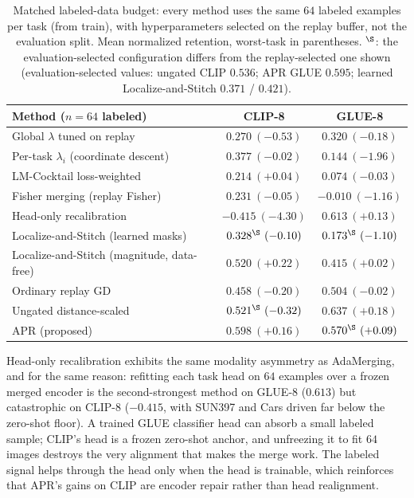 \documentclass[11pt]{article}
\begin{document}
\begin{table}[t]
\centering
\small
\caption{Matched labeled-data budget: every method uses the same $64$ labeled examples per task (from train), with hyperparameters selected on the replay buffer, not the evaluation split. Mean normalized retention, worst-task in parentheses. $^\S$: the evaluation-selected configuration differs from the replay-selected one shown (evaluation-selected values: ungated CLIP $0.536$; APR GLUE $0.595$; learned Localize-and-Stitch $0.371$ / $0.421$).}
\label{tab:matched}
\begin{tabular}{lcc}
\toprule
Method ($n=64$ labeled) & CLIP-8 & GLUE-8 \\
\midrule
Global $\lambda$ tuned on replay          & $0.270\ (-0.53)$ & $0.320\ (-0.18)$ \\
Per-task $\lambda_i$ (coordinate descent) & $0.377\ (-0.02)$ & $0.144\ (-1.96)$ \\
LM-Cocktail loss-weighted                 & $0.214\ (+0.04)$ & $0.074\ (-0.03)$ \\
Fisher merging (replay Fisher)            & $0.231\ (-0.05)$ & $-0.010\ (-1.16)$ \\
Head-only recalibration                   & $-0.415\ (-4.30)$ & $0.613\ (+0.13)$ \\
Localize-and-Stitch (learned masks)       & $0.328^\S\ (-0.10)$ & $0.173^\S\ (-1.10)$ \\
Localize-and-Stitch (magnitude, data-free)& $0.520\ (+0.22)$ & $0.415\ (+0.02)$ \\
Ordinary replay GD                        & $0.458\ (-0.20)$ & $0.504\ (-0.02)$ \\
Ungated distance-scaled                   & $0.521^\S\ (-0.32)$ & $\mathbf{0.637}\ (+0.18)$ \\
APR (proposed)                            & $\mathbf{0.598}\ (+\mathbf{0.16})$ & $0.570^\S\ (+0.09)$ \\
\bottomrule
\end{tabular}
\end{table}

Head-only recalibration exhibits the same modality asymmetry as AdaMerging, and for the same reason: refitting each task head on $64$ examples over a frozen merged encoder is the second-strongest method on GLUE-8 ($0.613$) but catastrophic on CLIP-8 ($-0.415$, with SUN397 and Cars driven far below the zero-shot floor). A trained GLUE classifier head can absorb a small labeled sample; CLIP's head is a frozen zero-shot anchor, and unfreezing it to fit $64$ images destroys the very alignment that makes the merge work. The labeled signal helps through the head only when the head is trainable, which reinforces that APR's gains on CLIP are encoder repair rather than head realignment.
\end{document}
